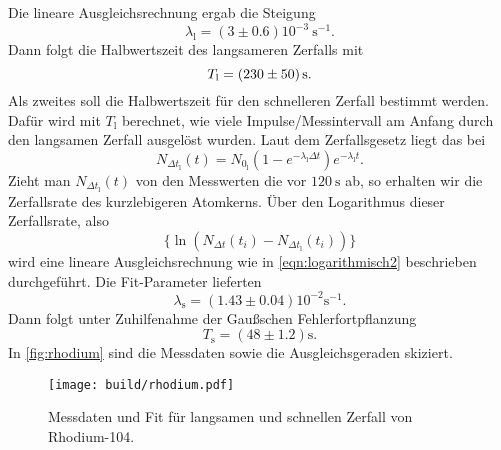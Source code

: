 Die lineare Ausgleichsrechnung ergab die Steigung
\begin{equation}
	\lambda_\text{l} = (3 \pm 0.6) 10^{-3}\ \si{\second}^{-1}.
\end{equation}
\noindent Dann folgt die Halbwertszeit des langsameren Zerfalls mit
\begin{equation}
	T_\text{l} = \SI{230\pm50}{\second}.
\end{equation}
\noindent
Als zweites soll die Halbwertszeit für den schnelleren Zerfall bestimmt werden. Dafür wird mit
$T_\text{l}$ berechnet, wie viele Impulse/Messintervall am Anfang durch den langsamen Zerfall ausgelöst wurden.
Laut dem Zerfallsgesetz liegt das bei
\begin{equation}
	N_{\Delta t_\text{l}} (t) = N_{0_\text{l}} \left(1 - e^{-\lambda_\text{l}\Delta t}\right) 
	e^{-\lambda_\text{l}t }.
\end{equation}
\noindent
Zieht man $N_{\Delta t_\text{l}}(t)$ von den Messwerten die vor $\SI{120}{\second}$ ab, so erhalten wir
die Zerfallsrate des kurzlebigeren Atomkerns. Über den Logarithmus dieser Zerfallsrate, also
\begin{equation}
	\{ \ln(N_{\Delta t}(t_i) - N_{\Delta t_\text{l}} (t_i)) \}
\end{equation}
wird eine lineare Ausgleichsrechnung wie in \autoref{eqn:logarithmisch2} beschrieben durchgeführt. Die
Fit-Parameter lieferten
\begin{equation}
	\lambda_\text{s} = (1.43 \pm 0.04) 10^{-2} \si{\second}^{-1}.
\end{equation}
Dann folgt unter Zuhilfenahme der Gaußschen Fehlerfortpflanzung
\begin{equation}
	T_\text{s} = (48\pm1.2)\si{\second}.
\end{equation}
\noindent
In \autoref{fig:rhodium} sind die Messdaten sowie die Ausgleichsgeraden skiziert.
\begin{figure}[H]
	\centering
	\texttt{[image: build/rhodium.pdf]}
	\caption{Messdaten und Fit für langsamen und schnellen Zerfall von Rhodium-104.}
	\label{fig:rhodium}
\end{figure}
